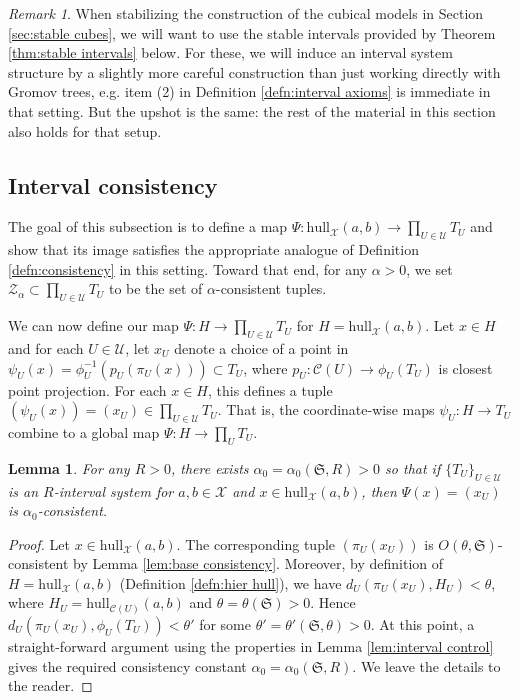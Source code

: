 \documentclass{amsart}
\newtheorem{lemma}[theorem]{Lemma}
\theoremstyle{definition}
\theoremstyle{remark}
\newtheorem{remark}[theorem]{Remark}
\theoremstyle{definition}
\newcommand{\calC}{\mathcal{C}}
\newcommand{\calU}{\mathcal{U}}
\newcommand{\calX}{\mathcal{X}}
\newcommand{\calZ}{\mathcal{Z}}
\newcommand{\hull}{\mathrm{hull}}
\begin{document}
\begin{remark}
When stabilizing the construction of the cubical models in Section \ref{sec:stable cubes}, we will want to use the stable intervals provided by Theorem \ref{thm:stable intervals} below.  For these, we will induce an interval system structure by a slightly more careful construction than just working directly with Gromov trees, e.g. item (2) in Definition \ref{defn:interval axioms} is immediate in that setting.  But the upshot is the same: the rest of the material in this section also holds for that setup.
\end{remark}

\subsection{Interval consistency}

The goal of this subsection is to define a map $\Psi:\hull_{\calX}(a,b)\to \prod_{U \in \calU} T_U$ and show that its image satisfies the appropriate analogue of Definition \ref{defn:consistency} in this setting.  Toward that end, for any $\alpha>0$, we set $\calZ_{\alpha} \subset \prod_{U \in \calU} T_U$ to be the set of $\alpha$-consistent tuples.

We can now define our map $\Psi:H \to \prod_{U \in \calU} T_U$ for $H = \hull_{\calX}(a,b)$.  Let $x \in H$ and for each $U \in \calU$, let $x_U$ denote a choice of a point in $\psi_U(x) = \phi_{U}^{-1}(p_U(\pi_U(x))) \subset T_U$, where $p_U:\calC(U)\to \phi_U(T_U)$ is closest point projection.  For each $x \in H$, this defines a tuple $(\psi_U(x)) = (x_U) \in \prod_{U \in \calU}T_U$.  That is, the coordinate-wise maps $\psi_U:H \to T_U$ combine to a global map $\Psi:H \to \prod_U T_U$.

\begin{lemma}\label{lem:interval consistency}
For any $R>0$, there exists $\alpha_0 = \alpha_0(\mathfrak S,R)>0$ so that if $\{T_U\}_{U \in \calU}$ is an $R$-interval system for $a,b \in \calX$ and $x \in \hull_{\calX}(a,b)$, then $\Psi(x) = (x_U)$ is $\alpha_0$-consistent.
\end{lemma}

\begin{proof}

Let $x \in \hull_{\calX}(a,b)$.  The corresponding tuple $(\pi_U(x_U))$ is $O(\theta, \mathfrak S)$-consistent by Lemma \ref{lem:base consistency}.  Moreover, by definition of $H = \hull_{\calX}(a,b)$ (Definition \ref{defn:hier hull}), we have $d_U(\pi_U(x_U), H_U) < \theta$, where $H_U = \hull_{\calC(U)}(a,b)$ and $\theta = \theta(\mathfrak S)>0$.  Hence $d_U(\pi_U(x_U), \phi_U(T_U))<\theta'$ for some $\theta' = \theta'(\mathfrak S, \theta)>0$.  At this point, a straight-forward argument using the properties in Lemma \ref{lem:interval control} gives the required consistency constant $\alpha_0 = \alpha_0(\mathfrak S, R)$.  We leave the details to the reader.
\end{proof}
\end{document}
